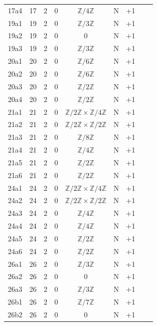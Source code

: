 \begin{table}[htbp]
\begin{tabular}{ccccccccc}
17a4 & 17 & 2 & 0 & $\mathbb{Z}/4\mathbb{Z}$ & N & +1 &  &  \\
19a1 & 19 & 2 & 0 & $\mathbb{Z}/3\mathbb{Z}$ & N & +1 &  &  \\
19a2 & 19 & 2 & 0 & 0 & N & +1 &  &  \\
19a3 & 19 & 2 & 0 & $\mathbb{Z}/3\mathbb{Z}$ & N & +1 &  &  \\
20a1 & 20 & 2 & 0 & $\mathbb{Z}/6\mathbb{Z}$ & N & +1 &  &  \\
20a2 & 20 & 2 & 0 & $\mathbb{Z}/6\mathbb{Z}$ & N & +1 &  &  \\
20a3 & 20 & 2 & 0 & $\mathbb{Z}/2\mathbb{Z}$ & N & +1 &  &  \\
20a4 & 20 & 2 & 0 & $\mathbb{Z}/2\mathbb{Z}$ & N & +1 &  &  \\
21a1 & 21 & 2 & 0 & $\mathbb{Z}/2\mathbb{Z} \times \mathbb{Z}/4\mathbb{Z}$ & N & +1 &  &  \\
21a2 & 21 & 2 & 0 & $\mathbb{Z}/2\mathbb{Z} \times \mathbb{Z}/2\mathbb{Z}$ & N & +1 &  &  \\
21a3 & 21 & 2 & 0 & $\mathbb{Z}/8\mathbb{Z}$ & N & +1 &  &  \\
21a4 & 21 & 2 & 0 & $\mathbb{Z}/4\mathbb{Z}$ & N & +1 &  &  \\
21a5 & 21 & 2 & 0 & $\mathbb{Z}/2\mathbb{Z}$ & N & +1 &  &  \\
21a6 & 21 & 2 & 0 & $\mathbb{Z}/2\mathbb{Z}$ & N & +1 &  &  \\
24a1 & 24 & 2 & 0 & $\mathbb{Z}/2\mathbb{Z} \times \mathbb{Z}/4\mathbb{Z}$ & N & +1 &  &  \\
24a2 & 24 & 2 & 0 & $\mathbb{Z}/2\mathbb{Z} \times \mathbb{Z}/2\mathbb{Z}$ & N & +1 &  &  \\
24a3 & 24 & 2 & 0 & $\mathbb{Z}/4\mathbb{Z}$ & N & +1 &  &  \\
24a4 & 24 & 2 & 0 & $\mathbb{Z}/4\mathbb{Z}$ & N & +1 &  &  \\
24a5 & 24 & 2 & 0 & $\mathbb{Z}/2\mathbb{Z}$ & N & +1 &  &  \\
24a6 & 24 & 2 & 0 & $\mathbb{Z}/2\mathbb{Z}$ & N & +1 &  &  \\
26a1 & 26 & 2 & 0 & $\mathbb{Z}/3\mathbb{Z}$ & N & +1 &  &  \\
26a2 & 26 & 2 & 0 & 0 & N & +1 &  &  \\
26a3 & 26 & 2 & 0 & $\mathbb{Z}/3\mathbb{Z}$ & N & +1 &  &  \\
26b1 & 26 & 2 & 0 & $\mathbb{Z}/7\mathbb{Z}$ & N & +1 &  &  \\
26b2 & 26 & 2 & 0 & 0 & N & +1 &  &  \\

\end{tabular}
\end{table}
